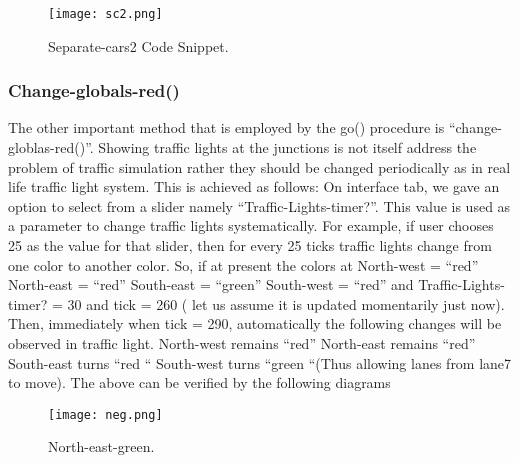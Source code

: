 \documentclass[11pt,a4paper]{article}
\begin{document}
\begin{figure}[!ht]
\centering
\texttt{[image: sc2.png]}
\caption{\label{fig:sc2}Separate-cars2 Code Snippet.}
\end{figure}

\subsubsection{\textbf{Change-globals-red()}}

The other important method that is employed by the go() procedure is “change-globlas-red()”. Showing traffic lights at the junctions is not itself address the problem of traffic simulation rather they should be changed periodically as in real life traffic light system. This is achieved as follows:\newline
On interface tab, we gave an option to select from a slider namely “Traffic-Lights-timer?”. This value is used as a parameter to change traffic lights systematically. For example, if user chooses 25 as the value for that slider, then for every 25 ticks traffic lights change from one color to another color. So, if at present the colors at\newline
                                     North-west = “red”\newline
                                     North-east = “red”\newline
                                     South-east = “green”\newline
                                     South-west = “red” and Traffic-Lights-timer? = 30 and tick = 260 ( let us assume it is  updated momentarily just now). Then, immediately when tick = 290, automatically the following changes will be observed in traffic light.\newline 
                                      North-west remains “red”\newline
                                      North-east remains “red”\newline
                                      South-east turns “red “\newline
                                      South-west turns “green “(Thus allowing lanes from lane7 to move).\newline
The above can be verified by the following diagrams

\begin{figure}[!ht]
\centering
\texttt{[image: neg.png]}
\caption{\label{fig:neg}North-east-green.}
\end{figure}
\end{document}
